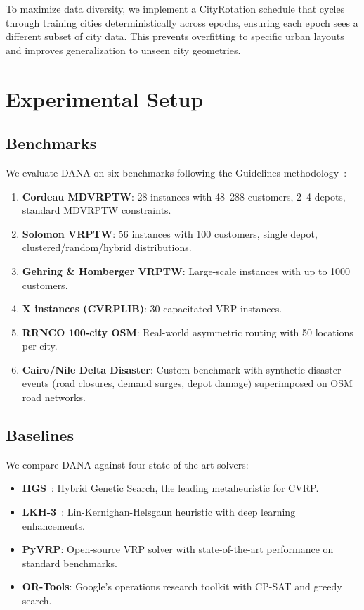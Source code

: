 \documentclass[12pt,a4paper]{article}
\begin{document}
To maximize data diversity, we implement a CityRotation schedule that cycles
through training cities deterministically across epochs, ensuring each epoch
sees a different subset of city data. This prevents overfitting to specific
urban layouts and improves generalization to unseen city geometries.

\section{Experimental Setup}

\subsection{Benchmarks}

We evaluate DANA on six benchmarks following the Guidelines
methodology~\cite{guidelines2021}:

\begin{enumerate}
	\item \textbf{Cordeau MDVRPTW}: 28 instances with 48--288 customers, 2--4
	      depots, standard MDVRPTW constraints.
	\item \textbf{Solomon VRPTW}: 56 instances with 100 customers, single depot,
	      clustered/random/hybrid distributions.
	\item \textbf{Gehring \& Homberger VRPTW}: Large-scale instances with up to
	      1000 customers.
	\item \textbf{X instances (CVRPLIB)}: 30 capacitated VRP instances.
	\item \textbf{RRNCO 100-city OSM}: Real-world asymmetric routing with 50
	      locations per city.
	\item \textbf{Cairo/Nile Delta Disaster}: Custom benchmark with synthetic
	      disaster events (road closures, demand surges, depot damage) superimposed
	      on OSM road networks.
\end{enumerate}

\subsection{Baselines}

We compare DANA against four state-of-the-art solvers:

\begin{itemize}
	\item \textbf{HGS}~\cite{hgs2021}: Hybrid Genetic Search, the leading
	      metaheuristic for CVRP.
	\item \textbf{LKH-3}~\cite{neuralkh2021}: Lin-Kernighan-Helsgaun heuristic
	      with deep learning enhancements.
	\item \textbf{PyVRP}: Open-source VRP solver with state-of-the-art
	      performance on standard benchmarks.
	\item \textbf{OR-Tools}: Google's operations research toolkit with
	      CP-SAT and greedy search.
\end{itemize}
\end{document}
